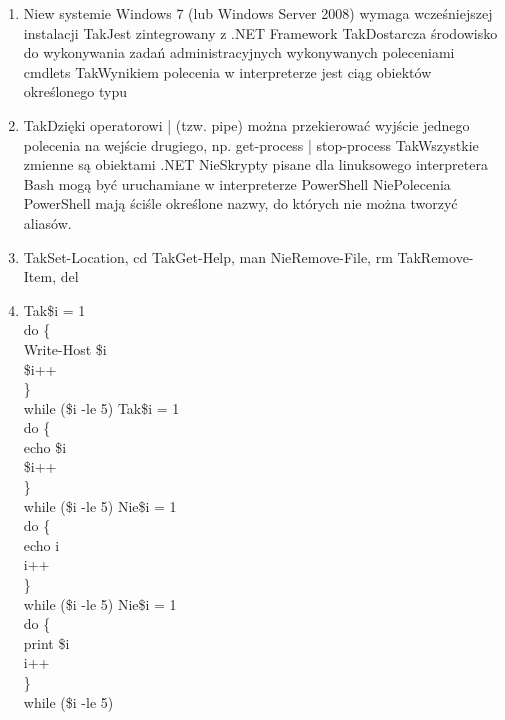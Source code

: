 \begin{enumerate}
		\newpage
		\item {}%
		{Nie}{w systemie Windows 7 (lub Windows Server 2008) wymaga wcześniejszej instalacji}%
		{Tak}{Jest zintegrowany z .NET Framework}%
		{Tak}{Dostarcza środowisko do wykonywania zadań administracyjnych wykonywanych poleceniami cmdlets}%
		{Tak}{Wynikiem polecenia w interpreterze jest ciąg obiektów określonego typu}
		\item {}%
		{Tak}{Dzięki operatorowi | (tzw. pipe) można przekierować wyjście jednego polecenia na wejście drugiego, np. get-process | stop-process}%
		{Tak}{Wszystkie zmienne są obiektami .NET}%
		{Nie}{Skrypty pisane dla linuksowego interpretera Bash mogą być uruchamiane w interpreterze PowerShell}%
		{Nie}{Polecenia PowerShell mają ściśle określone nazwy, do których nie można tworzyć aliasów.}
		\item {}%
		{Tak}{Set-Location, cd}%
		{Tak}{Get-Help, man}%
		{Nie}{Remove-File, rm}%
		{Tak}{Remove-Item, del}
		\item {}%
		{Tak}{\$i = 1\\
			do \{\\
				Write-Host \$i\\
				\$i++\\
			\}\\
			while (\$i -le 5)}%
		{Tak}{\$i = 1\\
			do \{\\
				echo \$i\\
				\$i++\\
			\}\\
			while (\$i -le 5)}%
		{Nie}{\$i = 1\\
			do \{\\
				echo i\\
				i++\\
			\}\\
			while (\$i -le 5)}%
		{Nie}{\$i = 1\\
			do \{\\
				print \$i\\
				i++\\
			\}\\
			while (\$i -le 5)}
		

\end{enumerate}
